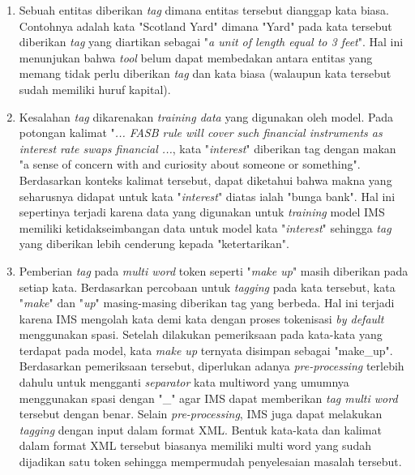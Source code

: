 \begin{enumerate}
	\item Sebuah entitas diberikan \textit{tag} dimana entitas tersebut dianggap kata biasa. Contohnya adalah kata "Scotland Yard" dimana "Yard" pada kata tersebut diberikan \textit{tag} yang diartikan sebagai "\textit{a unit of length equal to 3 feet}". Hal ini menunjukan bahwa \textit{tool} belum dapat membedakan antara entitas yang memang tidak perlu diberikan \textit{tag} dan kata biasa (walaupun kata tersebut sudah memiliki huruf kapital).
	\item Kesalahan \textit{tag} dikarenakan \textit{training data} yang digunakan oleh model. Pada potongan kalimat "\textit{... FASB rule will cover such financial instruments as interest rate swaps financial ...}, kata "\textit{interest}" diberikan tag dengan makan "a sense of concern with and curiosity about someone or something". Berdasarkan konteks kalimat tersebut, dapat diketahui bahwa makna yang seharusnya didapat untuk kata "\textit{interest}" diatas ialah "bunga bank". Hal ini sepertinya terjadi karena data yang digunakan untuk \textit{training} model IMS memiliki ketidakseimbangan data untuk model kata "\textit{interest}" sehingga \textit{tag} yang diberikan lebih cenderung kepada "ketertarikan".
	\item Pemberian \textit{tag} pada \textit{multi word} token seperti "\textit{make up}" masih diberikan pada setiap kata. Berdasarkan percobaan untuk \textit{tagging} pada kata tersebut, kata "\textit{make}" dan "\textit{up}" masing-masing diberikan tag yang berbeda. Hal ini terjadi karena IMS mengolah kata demi kata dengan proses tokenisasi \textit{by default} menggunakan spasi. Setelah dilakukan pemeriksaan pada kata-kata yang terdapat pada model, kata \textit{make up} ternyata disimpan sebagai "make\_up". Berdasarkan pemeriksaan tersebut, diperlukan adanya \textit{pre-processing} terlebih dahulu untuk mengganti \textit{separator} kata multiword yang umumnya menggunakan spasi dengan "\_" agar IMS dapat memberikan \textit{tag multi word} tersebut dengan benar. Selain \textit{pre-processing},  IMS juga dapat melakukan \textit{tagging} dengan input dalam format XML. Bentuk kata-kata dan kalimat dalam format XML tersebut biasanya memiliki multi word yang sudah dijadikan satu token sehingga mempermudah penyelesaian masalah tersebut.
\end{enumerate}

